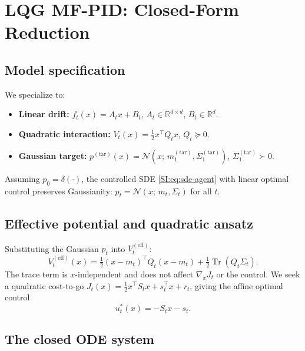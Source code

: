\documentclass[11pt,onecolumn]{article}
\newcommand{\Rbb}{\mathbb{R}}
\newcommand{\calN}{\mathcal{N}}
\newcommand{\tr}{\operatorname{Tr}}
\newcommand{\ptar}{p^{(\mathrm{tar})}}
\newcommand{\Veff}{V^{(\mathrm{eff})}}
\begin{document}
\section{LQG MF-PID: Closed-Form Reduction}
\label{SI:lqg}

\subsection{Model specification}
\label{SI:lqg:model}

We specialize to:
\begin{itemize}
  \item \textbf{Linear drift:} $f_t(x) = A_t x + B_t$,
    $A_t\in\Rbb^{d\times d}$, $B_t\in\Rbb^d$.
  \item \textbf{Quadratic interaction:} $V_t(x) = \tfrac{1}{2}x^\top Q_t x$,
    $Q_t\succeq 0$.
  \item \textbf{Gaussian target:}
    $\ptar(x) = \calN(x;\,m_1^{(\mathrm{tar})},\Sigma_1^{(\mathrm{tar})})$,
    $\Sigma_1^{(\mathrm{tar})}\succ 0$.
\end{itemize}
Assuming $p_0=\delta(\cdot)$, the controlled SDE \eqref{SI:eq:sde-agent}
with linear optimal control preserves Gaussianity:
$p_t = \calN(x;\,m_t,\Sigma_t)$ for all $t$.

\subsection{Effective potential and quadratic ansatz}
\label{SI:lqg:eff-potential}

Substituting the Gaussian $p_t$ into $\Veff_t$:
\begin{equation}
  \Veff_t(x)
  = \tfrac{1}{2}(x-m_t)^\top Q_t(x-m_t)
    + \tfrac{1}{2}\tr(Q_t\Sigma_t).
  \label{SI:eq:Veff-lqg}
\end{equation}
The trace term is $x$-independent and does not affect $\nabla_x J_t$ or
the control.
We seek a quadratic cost-to-go
$J_t(x) = \tfrac{1}{2}x^\top S_t x + s_t^\top x + r_t$,
giving the affine optimal control
\begin{equation}
  u_t^*(x) = -S_t x - s_t.
  \label{SI:eq:u-star-lqg}
\end{equation}

\subsection{The closed ODE system}
\label{SI:lqg:odes}
\end{document}
